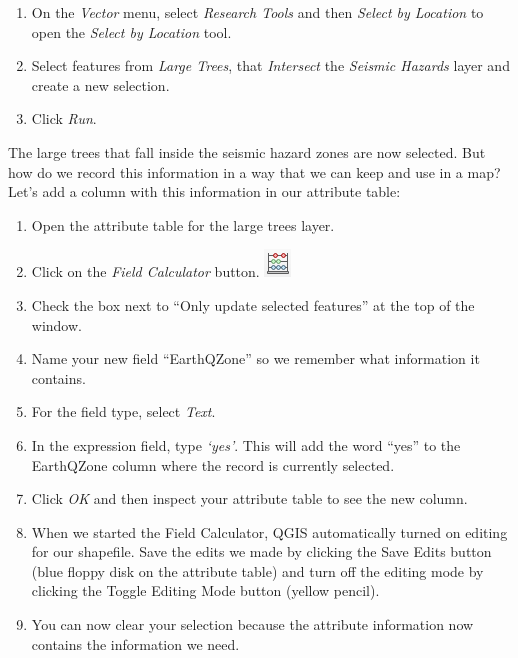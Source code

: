 \documentclass[
]{article}
\providecommand{\tightlist}{%
  \setlength{\itemsep}{0pt}\setlength{\parskip}{0pt}}
\begin{document}
\begin{enumerate}
\def\labelenumi{\arabic{enumi}.}
\tightlist
\item
  On the \emph{Vector} menu, select \emph{Research Tools} and then \emph{Select by Location} to open the \emph{Select by Location} tool.
\item
  Select features from \emph{Large Trees}, that \emph{Intersect} the \emph{Seismic Hazards} layer and create a new selection.
\item
  Click \emph{Run}.
\end{enumerate}

The large trees that fall inside the seismic hazard zones are now selected. But how do we record this information in a way that we can keep and use in a map? Let's add a column with this information in our attribute table:

\begin{enumerate}
\def\labelenumi{\arabic{enumi}.}
\tightlist
\item
  Open the attribute table for the large trees layer.
\item
  Click on the \emph{Field Calculator} button. \includegraphics{./images/Tool_FieldCalculator.png}
\item
  Check the box next to ``Only update selected features'' at the top of the window.
\item
  Name your new field ``EarthQZone'' so we remember what information it contains.
\item
  For the field type, select \emph{Text}.
\item
  In the expression field, type \emph{`yes'}. This will add the word ``yes'' to the EarthQZone column where the record is currently selected.
\item
  Click \emph{OK} and then inspect your attribute table to see the new column.
\item
  When we started the Field Calculator, QGIS automatically turned on editing for our shapefile. Save the edits we made by clicking the Save Edits button (blue floppy disk on the attribute table) and turn off the editing mode by clicking the Toggle Editing Mode button (yellow pencil).
\item
  You can now clear your selection because the attribute information now contains the information we need.
\end{enumerate}
\end{document}
